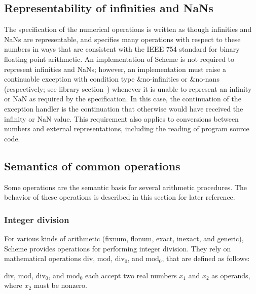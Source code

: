 \subsection{Representability of infinities and NaNs}
\label{infinitiesnanssection}

The specification of the numerical operations is written as though
infinities and NaNs are representable, and specifies many operations
with respect to these numbers in ways that are consistent with the
IEEE 754 standard for binary floating point arithmetic.  
An implementation of Scheme is not required to represent infinities and
NaNs; however,
an implementation must raise a continuable exception with
condition type {\cf\&no-infinities} or {\cf\&no-nans} (respectively;
see library section~)
whenever it is unable to represent an infinity or NaN as required by
the specification.  In this case, the continuation of the exception
handler is the continuation that otherwise would have received
the infinity or NaN value.  This requirement also applies to
conversions between numbers and external representations, including
the reading of program source code.

\subsection{Semantics of common operations}

Some operations are the semantic basis for several arithmetic
procedures.  The behavior of these operations is described in this
section for later reference.

\subsubsection{Integer division}
\label{integerdivision}

For various kinds of arithmetic (fixnum, flonum, exact, inexact, and
generic), Scheme provides operations for performing integer
division.  They rely on mathematical operations $\mathrm{div}$,
$\mathrm{mod}$, $\mathrm{div}_0$, and
$\mathrm{mod}_0$, that are defined as follows:

$\mathrm{div}$, $\mathrm{mod}$, $\mathrm{div}_0$, and $\mathrm{mod}_0$
each accept two real numbers $x_1$ and $x_2$ as operands, where
$x_2$ must be nonzero.

